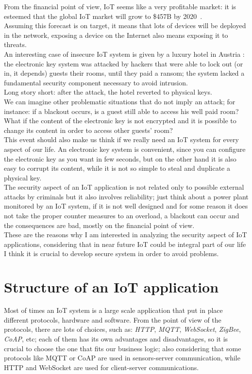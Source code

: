 \documentclass[12pt]{report}
\begin{document}
From the financial point of view, IoT seems like a very profitable market: it is esteemed that the global IoT market will grow to \$457B by 2020~\cite{forbes}.\\ 
Assuming this forecast is on target, it means that lots of devices will be deployed in the network, exposing a device on the Internet also means exposing it to threats.\\
An interesting case of insecure IoT system is given by a luxury hotel in Austria \cite{whydoiot}: the electronic key system was attacked
by hackers that were able to lock out (or in, it depends) guests their rooms, until they paid a ransom; the system lacked a fundamental security
component necessary to avoid intrusion.\\
Long story short: after the attack, the hotel reverted to physical keys.\\
We can imagine other problematic situations that do not imply an attack; for instance: if a blackout occurs, is a guest still able to access his well paid room?\\
What if the content of the electronic key is not encrypted and it is possible to change its content in order to access other guests' room?\\
This event should also make us think if we really need an IoT system for every aspect of our life. An electronic key system is convenient, since you can configure the electronic key as you want in few seconds, but on the other hand it is also easy to corrupt its content, while it is not so simple to steal and duplicate a physical key.\\
 
The security aspect of an IoT application is not related only to possible external attacks by criminals but it also involves reliability; just think about a power plant monitored by an IoT system, if it is not well designed and for some reason it does not take the proper counter measures to an overload, a blackout can occur and the consequences are bad, mostly on the financial point of view.\\
These are the reasons why I am interested in analyzing the security aspect of IoT applications, considering that in near future
IoT could be integral part of our life I think it is crucial to develop secure system in order to avoid problems.


\section{Structure of an IoT application}
\bigskip
Most of times an IoT system is a large scale application that put in place different protocols, hardware and software.\newline
From the point of view of the protocols, there are lots of choices, such as: \emph{HTTP}, \emph{MQTT}, \emph{WebSocket}, \emph{ZigBee}, \emph{CoAP}, etc; each of them has its own advantages and disadvantages, so it is crucial to choose the one that fits our business logic; also considering that some protocols like MQTT or CoAP are used in sensors-server communication, while HTTP and WebSocket are used for client-server communications.\\
\end{document}

